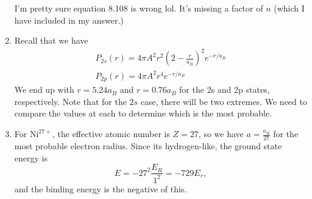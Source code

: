 \documentclass{article}
\begin{document}
\begin{enumerate}[label=(8.\arabic*)]
     I'm pretty sure equation 8.108 is wrong lol. It's missing a factor of $n$ (which I have included in my answer.)
    \item Recall that we have 
    \begin{align*}
        P_{2s}(r) = 4\pi A^2 r^2 \left(2-\frac{r}{a_B}\right)^2 e^{-r/a_B} \\ 
        P_{2p}(r) = 4\pi A^2 r^4 e^{-r/a_B}
    \end{align*}
    We end up with $r=5.24a_B$ and $r=0.76a_B$ for the 2s and 2p states, respectively. Note that for the $2s$ case, there will be two extremes. We need to compare the values at each to determine which is the most probable.
    \item For $\text{Ni}^{27+}$, the effective atomic number is $Z=27$, so we have $a = \frac{a_B}{27}$ for the most probable electron radius. Since its hydrogen-like, the ground state energy is 
    \begin{equation}
        E = -27^2 \frac{E_R}{1^2} = -729E_r,
    \end{equation}
    and the binding energy is the negative of this.
\end{enumerate}
\end{document}
